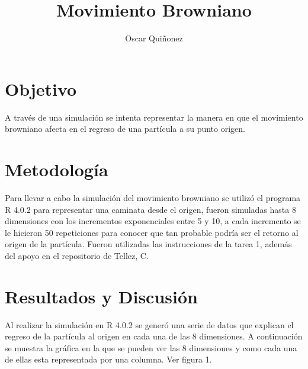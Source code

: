 \documentclass{article}
\title { Movimiento Browniano}
\author{Oscar Qui\~nonez}
\begin{document}
\maketitle
 
\section{Objetivo}\label{met}

A trav\'es de una simulaci\'on se intenta representar la manera en que el movimiento browniano afecta en el regreso de una part\'icula a su punto origen.

\section{Metodolog\'ia}\label{met}

Para llevar a cabo la simulaci\'on del movimiento browniano se utiliz\'o el programa R 4.0.2 para representar una caminata desde el origen, fueron simuladas hasta 8 dimensiones con los incrementos exponenciales entre 5 y 10, a cada incremento se le hicieron 50 repeticiones para conocer que tan probable podr\'ia ser el retorno al origen de la part\'icula. \cite{satuelisa} Fueron utilizadas las instrucciones de la tarea 1, \cite{clara} adem\'as del apoyo en el repositorio de Tellez, C.

\section{Resultados y Discusi\'on}\label{res}

Al realizar la simulaci\'on en R 4.0.2 se gener\'o una serie de datos que explican el regreso de la part\'icula al origen en cada una de las 8 dimensiones. A continuaci\'on se muestra la gr\'afica en la que se pueden ver las 8 dimensiones y como cada una de ellas esta representada por una columna. Ver figura 1.
\end{document}
